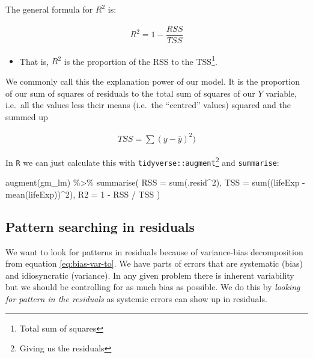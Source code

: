 \documentclass[
]{report}
\newenvironment{Shaded}{\begin{snugshade}}{\end{snugshade}}
\newcommand{\AttributeTok}[1]{\textcolor[rgb]{0.80,0.80,0.80}{#1}}
\newcommand{\DecValTok}[1]{\textcolor[rgb]{0.86,0.86,0.80}{#1}}
\newcommand{\FunctionTok}[1]{\textcolor[rgb]{0.94,0.94,0.56}{#1}}
\newcommand{\NormalTok}[1]{\textcolor[rgb]{0.80,0.80,0.80}{#1}}
\newcommand{\SpecialCharTok}[1]{\textcolor[rgb]{0.86,0.64,0.64}{#1}}
\providecommand{\tightlist}{%
  \setlength{\itemsep}{0pt}\setlength{\parskip}{0pt}}
\renewenvironment{quote}{
	\bigskip\begin{mdframed}[
			skipabove=\topskip,
			skipbelow=\topskip,
			backgroundcolor=quoteshadecolor,
			leftmargin=0.5cm,
			rightmargin=0.5cm,
			topline=false,
			rightline=false,
			bottomline=false,
			nobreak=true,
		]\itshape%
		}{
	\end{mdframed}
}
\renewenvironment{Shaded}{
	\bigskip
	\begin{tcolorbox}[drop fuzzy midday shadow]
		\begin{mdframed}[
				skipabove=\topskip*2,
				outerlinewidth= 0,
				linewidth=0pt,
				roundcorner= 3pt,
				backgroundcolor= shadecolor,
				outerlinecolor= shadecolor,
				innertopmargin= \topskip,
				innerbottommargin=\topskip,
				leftmargin=-0.8cm,
				rightmargin=-0.8cm
			]}{
		\end{mdframed}
	\end{tcolorbox}
	\smallskip
}
\theoremstyle{definition}
\theoremstyle{definition}
\theoremstyle{definition}
\theoremstyle{definition}
\theoremstyle{remark}
\begin{document}
The general formula for \(R^{2}\) is:

\begin{align}
  R^{2} = 1 - \dfrac{RSS}{TSS}
\end{align}

\begin{itemize}
\tightlist
\item
  That is, \(R^{2}\) is the proportion of the RSS to the TSS\footnote{Total sum of
    squares}.
\end{itemize}

\begin{quote}
We commonly call this the explanation power of our model. It is the
proportion of our sum of squares of residuals to the total sum of squares of
our \(Y\) variable, i.e.~all the values less their means (i.e.~the ``centred''
values) squared and the summed up

\begin{align*}
TSS = \sum(y - \overline{y})^{2})
\end{align*}
\end{quote}

In \texttt{R} we can just calculate this with \texttt{tidyverse::augment}\footnote{Giving us the
  residuals} and \texttt{summarise}:

\begin{Shaded}
\begin{Highlighting}[numbers=left,,]
\FunctionTok{augment}\NormalTok{(gm\_lm) }\SpecialCharTok{\%\textgreater{}\%}
  \FunctionTok{summarise}\NormalTok{(}
    \AttributeTok{RSS =} \FunctionTok{sum}\NormalTok{(.resid}\SpecialCharTok{\^{}}\DecValTok{2}\NormalTok{),}
    \AttributeTok{TSS =} \FunctionTok{sum}\NormalTok{((lifeExp }\SpecialCharTok{{-}} \FunctionTok{mean}\NormalTok{(lifeExp))}\SpecialCharTok{\^{}}\DecValTok{2}\NormalTok{),}
    \AttributeTok{R2 =} \DecValTok{1} \SpecialCharTok{{-}}\NormalTok{ RSS }\SpecialCharTok{/}\NormalTok{ TSS}
\NormalTok{  )}
\end{Highlighting}
\end{Shaded}

\hypertarget{pattern-searching-in-residuals}{%
\subsection{Pattern searching in residuals}\label{pattern-searching-in-residuals}}

We want to look for patterns in residuals because of variance-bias
decomposition from equation \eqref{eq:bias-var-to}. We have parts of errors that
are systematic (bias) and idiosyncratic (variance). In any given problem there
is inherent variability but we should be controlling for as much bias as
possible. We do this by \emph{looking for pattern in the residuals} as systemic
errors can show up in residuals.
\end{document}
